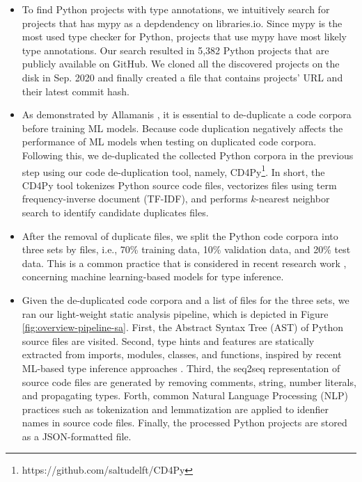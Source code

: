 \documentclass[10pt, conference]{IEEEtran}
\begin{document}
\begin{itemize}
	\item To find Python projects with type annotations, we intuitively search for projects that has mypy as a depdendency on libraries.io. Since mypy is the most used type checker for Python, projects that use mypy have most likely type annotations. Our search resulted in 5,382 Python projects that are publicly available on GitHub. We cloned all the discovered projects on the disk in Sep. 2020 and finally created a file that contains projects' URL and their latest commit hash.
	\item As demonstrated by Allamanis \cite{allamanis2019adverse}, it is essential to de-duplicate a code corpora before training ML models. Because code duplication negatively affects the performance of ML models when testing on duplicated code corpora. Following this, we de-duplicated the collected Python corpora in the previous step using our code de-duplication tool, namely, CD4Py\footnote{https://github.com/saltudelft/CD4Py}. In short, the CD4Py tool tokenizes Python source code files, vectorizes files using term frequency-inverse document (TF-IDF), and performs $k$-nearest neighbor search to identify candidate duplicates files.
	\item After the removal of duplicate files, we split the Python code corpora into three sets by files, i.e., 70\% training data, 10\% validation data, and 20\% test data. This is a common practice that is considered in recent research work \cite{pradel2019typewriter, allamanis2020typilus}, concerning machine learning-based models for type inference.
	\item Given the de-duplicated code corpora and a list of files for the three sets, we ran our light-weight static analysis pipeline, which is depicted in Figure \ref{fig:overview-pipeline-sa}. First, the Abstract Syntax Tree (AST) of Python source files are visited. Second, type hints and features are statically extracted from imports, modules, classes, and functions, inspired by recent ML-based type inference approaches \cite{pradel2019typewriter, malik2019nl2type}. Third, the seq2seq representation of source code files \cite{hellendoorn2018deep} are generated by removing comments, string, number literals, and propagating types. Forth, common Natural Language Processing (NLP) practices such as tokenization and lemmatization are applied to idenfier names in source code files. Finally, the processed Python projects are stored as a JSON-formatted file. 
\end{itemize}
\end{document}

